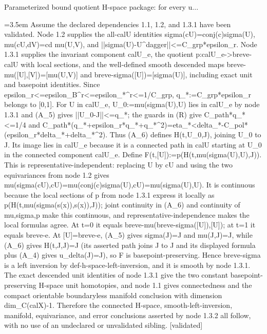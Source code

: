 \documentclass{article}
\newcommand{\step}[1]{\par\noindent\hangindent=3.5em\hangafter=1%
  \makebox[3.5em][l]{\textbf{#1.}}}
\newcommand{\steptag}[1]{\hfill{\small\textsf{[#1]}}}
\begin{document}
\begin{proofbox}{Parameterized bound quotient H-space package: for every u...}
\step{1.3.2.1} Assume the declared dependencies 1.1, 1.2, and 1.3.1 have been validated. Node 1.2 supplies the all-calU identities sigma(cU)=conj(c)sigma(U), mu(cU,dV)=cd mu(U,V), and ||sigma(U)-U\textasciicircum{}dagger||<=C\_grp*epsilon\_r. Node 1.3.1 supplies the invariant component calU\_e, the quotient p:calU\_e->breve-calU with local sections, and the well-defined smooth descended maps breve-mu([U],[V])=[mu(U,V)] and breve-sigma([U])=[sigma(U)], including exact unit and basepoint identities. Since epsilon\_r<=epsilon\_B\textasciicircum{}r<=epsilon\_*\textasciicircum{}r<=1/C\_grp, q\_*:=C\_grp*epsilon\_r belongs to [0,1]. For U in calU\_e, U\_0:=mu(sigma(U),U) lies in calU\_e by node 1.3.1 and (A\_5) gives ||U\_0-J||<=q\_*; the guards in (R) give C\_path*q\_*<=1/4 and C\_path*(q\_*+epsilon\_r*q\_*+q\_*\textasciicircum{}2)=eta\_*<delta\_*-C\_pol*(epsilon\_r*delta\_*+delta\_*\textasciicircum{}2). Thus (A\_6) defines H(t,U\_0,J), joining U\_0 to J. Its image lies in calU\_e because it is a connected path in calU starting at U\_0 in the connected component calU\_e. Define F(t,[U]):=p(H(t,mu(sigma(U),U),J)). This is representative-independent: replacing U by cU and using the two equivariances from node 1.2 gives mu(sigma(cU),cU)=mu(conj(c)sigma(U),cU)=mu(sigma(U),U). It is continuous because the local sections of p from node 1.3.1 express it locally as p(H(t,mu(sigma(s(x)),s(x)),J)); joint continuity in (A\_6) and continuity of mu,sigma,p make this continuous, and representative-independence makes the local formulas agree. At t=0 it equals breve-mu(breve-sigma([U]),[U]); at t=1 it equals breve-e. At [U]=breve-e, (A\_5) gives sigma(J)=J and mu(J,J)=J, while (A\_6) gives H(t,J,J)=J (its asserted path joins J to J and its displayed formula plus (A\_4) gives u\_delta(J)=J), so F is basepoint-preserving. Hence breve-sigma is a left inversion by def-h-space-left-inversion, and it is smooth by node 1.3.1. The exact descended unit identities of node 1.3.1 give the two constant basepoint-preserving H-space unit homotopies, and node 1.1 gives connectedness and the compact orientable boundaryless manifold conclusion with dimension dim\_C(calX)-1. Therefore the connected H-space, smooth-left-inversion, manifold, equivariance, and error conclusions asserted by node 1.3.2 all follow, with no use of an undeclared or unvalidated sibling. \steptag{validated} \\[4pt]
\end{proofbox}
\end{document}
